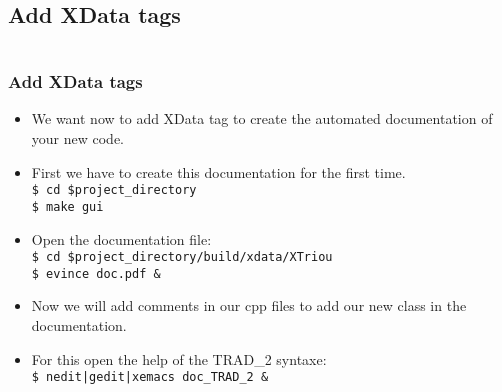 \documentclass[10pt, hyperref={unicode=true,pdfusetitle, bookmarks=true,bookmarksnumbered=false,bookmarksopen=false, breaklinks=false,pdfborder={0 0 1},backref=true,colorlinks=true,linkcolor=darkblue,pageanchor, urlcolor=darkblue}]{beamer}
\begin{document}
\subsection{{\bf{Add XData tags}}}
\begin{frame}
\begin{columns}[c] 
\tableofcontents[sections={1-3},currentsection, currentsubsection]
\tableofcontents[sections={4-8},currentsection, currentsubsection]
\end{columns}
\end{frame}
\begin{frame}
\frametitle{Add XData tags}
\begin{block}{}

\begin{itemize}
\item We want now to add XData tag to create the automated documentation of your new code.
\item First we have to create this documentation for the first time.\\
\texttt{\$ cd \$project\_directory}\\
\texttt{\$ make gui}
\item Open the documentation file:\\
\texttt{\$ cd \$project\_directory/build/xdata/XTriou}\\
\texttt{\$ evince doc.pdf \&}
\item Now we will add comments in our cpp files to add our new class in the documentation.
\item For this open the help of the TRAD\_2 syntaxe:\\
\texttt{\$ nedit|gedit|xemacs doc\_TRAD\_2 \&}
\end{itemize}

\end{block}
\end{frame}
\end{document}

